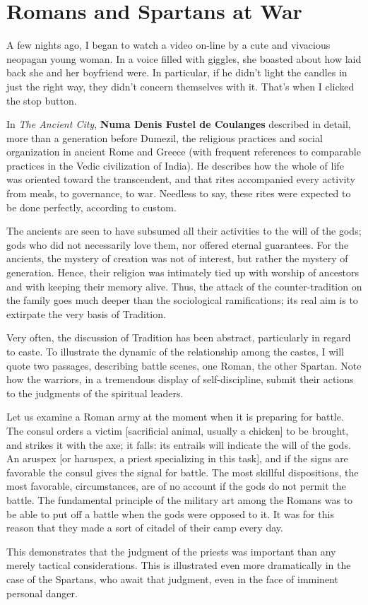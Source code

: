 \section{Romans and Spartans at War}

\label{sec:RomansSpartansWar}

A few nights ago, I began to watch a video on-line by a cute and vivacious neopagan young woman. In a voice filled with giggles, she boasted about how laid back she and her boyfriend were. In particular, if he didn't light the candles in just the right way, they didn't concern themselves with it. That's when I clicked the stop button.

In \emph{The Ancient City}, \textbf{Numa Denis Fustel de Coulanges} described in detail, more than a generation before Dumezil, the religious practices and social organization in ancient Rome and Greece (with frequent references to comparable practices in the Vedic civilization of India). He describes how the whole of life was oriented toward the transcendent, and that rites accompanied every activity from meals, to governance, to war. Needless to say, these rites were expected to be done perfectly, according to custom.

The ancients are seen to have subsumed all their activities to the will of the gods; gods who did not necessarily love them, nor offered eternal guarantees. For the ancients, the mystery of creation was not of interest, but rather the mystery of generation. Hence, their religion was intimately tied up with worship of ancestors and with keeping their memory alive. Thus, the attack of the counter-tradition on the family goes much deeper than the sociological ramifications; its real aim is to extirpate the very basis of Tradition.

Very often, the discussion of Tradition has been abstract, particularly in regard to caste. To illustrate the dynamic of the relationship among the castes, I will quote two passages, describing battle scenes, one Roman, the other Spartan. Note how the warriors, in a tremendous display of self-discipline, submit their actions to the judgments of the spiritual leaders.

\begin{quotex}
Let us examine a Roman army at the moment when it is preparing for battle. The consul orders a victim [sacrificial animal, usually a chicken] to be brought, and strikes it with the axe; it falls: its entrails will indicate the will of the gods. An aruspex [or haruspex, a priest specializing in this task], and if the signs are favorable the consul gives the signal for battle. The most skillful dispositions, the most favorable, circumstances, are of no account if the gods do not permit the battle. The fundamental principle of the military art among the Romans was to be able to put off a battle when the gods were opposed to it. It was for this reason that they made a sort of citadel of their camp every day. 

\end{quotex}
This demonstrates that the judgment of the priests was important than any merely tactical considerations. This is illustrated even more dramatically in the case of the Spartans, who await that judgment, even in the face of imminent personal danger.

